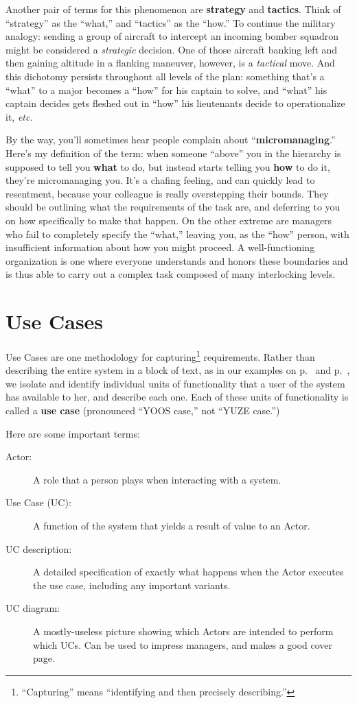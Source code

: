 Another pair of terms for this phenomenon are \textbf{strategy} and
\textbf{tactics}. Think of ``strategy'' as the ``what,'' and ``tactics'' as
the ``how.'' To continue the military analogy: sending a group of aircraft to
intercept an incoming bomber squadron might be considered a \textit{strategic}
decision. One of those aircraft banking left and then gaining altitude in a
flanking maneuver, however, is a \textit{tactical} move. And this dichotomy
persists throughout all levels of the plan: something that's a ``what'' to a
major becomes a ``how'' for his captain to solve, and ``what'' his captain
decides gets fleshed out in ``how'' his lieutenants decide to operationalize
it, \textit{etc.}

By the way, you'll sometimes hear people complain about
``\textbf{micromanaging}.'' Here's my definition of the term: when someone
``above'' you in the hierarchy is supposed to tell you \textbf{what} to do,
but instead starts telling you \textbf{how} to do it, they're micromanaging
you. It's a chafing feeling, and can quickly lead to resentment, because your
colleague is really overstepping their bounds. They should be outlining what
the requirements of the task are, and deferring to you on how specifically to
make that happen. On the other extreme are managers who fail to completely
specify the ``what,'' leaving you, as the ``how'' person, with insufficient
information about how you might proceed. A well-functioning organization is
one where everyone understands and honors these boundaries and is thus able to
carry out a complex task composed of many interlocking levels.


\section{Use Cases}

Use Cases are one methodology for capturing\footnote{``Capturing'' means
``identifying and then precisely describing.''} requirements. Rather than
describing the entire system in a block of text, as in our examples on
p.~\pageref{blockRequirements1} and
p.~\pageref{blockRequirements2}, we isolate and identify individual units of
functionality that a user of the system has available to her, and describe
each one. Each of these units of functionality is called a \textbf{use case}
(pronounced ``YOOS case,'' not ``YUZE case.'')

Here are some important terms:

\begin{description}
\item[Actor:] A role that a person plays when interacting with a system.
\item[Use Case (UC):] A function of the system that yields a result of value to an
Actor.
\item[UC description:] A detailed specification of exactly what happens
when the Actor executes the use case, including any important variants.
\item[UC diagram:] A mostly-useless picture showing which Actors are
intended to perform which UCs. Can be used to impress managers, and
makes a good cover page.
\end{description}

